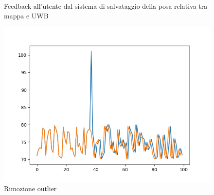 \begin{figure}[h!]
\centering

	
\caption{Feedback all'utente dal sistema di salvataggio della posa relativa tra mappa e UWB}
\label{fig:aaaaaaa}

\end{figure}


\clearpage

\begin{figure}[ht]
    \centering
    \includegraphics[width=1\textwidth]{Appendice2/Figs/rimozione_outliers.png}
    \caption[Rimozione outlier]{Rimozione outlier}
    \label{fig:rimozione_outlier}
\end{figure}

